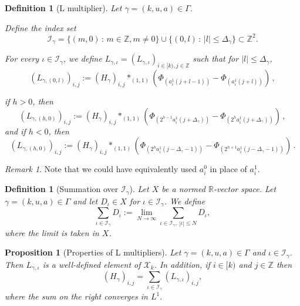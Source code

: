 \documentclass[12pt,reqno]{amsart}
\theoremstyle{plain}
\newtheorem{proposition}[theorem]{Proposition}
\newtheorem{definition}[theorem]{Definition}
\numberwithin{equation}{section}
\theoremstyle{remark}
\newtheorem{rem}{Remark}[section]
\newcommand{\using}[1]{}
\newcommand{\Z}{{\mathbb Z}}
\newcommand{\R}{{\mathbb R}}
\begin{document}
\begin{definition}[L multiplier]\label{L multiplier}
Let $\gamma=(k,u,a)\in \Gamma$.

Define the index set
\begin{equation}\label{auto:L-kernel-index-set}\mathcal{I}_{\gamma} = \{(m,0)\,:\,m\in\mathbb{Z}, m\not=0\} \cup \{(0,l)\,:\,|l|\le \Delta_{\gamma}\} \subset \mathbb{Z}^2.\end{equation}

For every $\iota \in\mathcal{I}_{\gamma}$, we define  $L_{\gamma,\iota}=(L_{\gamma,\iota})_{i\in [k),j\in \Z}$
such that for $|l|\le \Delta_{\gamma}$,
\begin{equation}\label{auto:L-kernel-central-band}
  (L_{\gamma,(0,l)})_{i,j}:= (H_{\gamma})_{i,j} \ast_{(1,1)} (\Phi_{(a_i^1(j+l-1))}-\Phi_{(a_i^1(j+l))})\, ,
 \end{equation}

if $h>0$, then
\begin{equation}\label{auto:L-kernel-positive-band}
(L_{\gamma,(h,0)})_{i,j}:= (H_{\gamma})_{i,j} \ast_{(1,1)} (\Phi_{(2^{h-1}a_i^1(j+\Delta_{\gamma}))}-\Phi_{(2^{h}a_i^1(j+\Delta_{\gamma}))})\, ,
\end{equation}
and if $h<0$, then
\begin{equation}\label{auto:L-kernel-negative-band}
 (L_{\gamma,(h,0)})_{i,j}:= (H_{\gamma})_{i,j} \ast_{(1,1)} (\Phi_{(2^{h}a_i^1(j-\Delta_{\gamma}-1))}-\Phi_{(2^{h+1}a_i^1(j-\Delta_{\gamma}-1))})\, .
\end{equation}
\end{definition}

\begin{rem}
Note that we could have equivalently used $a_{i}^0$ in place of $a_i^1$.
\end{rem}


\begin{definition}[Summation over $\mathcal I_{\gamma}$]\label{summation-definition}
Let $X$ be a normed $\R$-vector space.
Let $\gamma=(k,u,a)\in \Gamma$ and let $D_\iota \in X$ for $\iota \in \mathcal{I}_{\gamma}$. We define
\begin{equation}\label{auto:symmetric-series-definition}
\sum_{\iota \in \mathcal{I}_{\gamma}} D_{\iota}:=\lim_{N\to \infty} \sum_{\iota \in\mathcal{I}_{\gamma}, ~|\iota| \leq N} D_{\iota},
\end{equation}
where the limit is taken in $X$.
\end{definition}

\begin{proposition}[Properties of L multipliers]\label{sum L multiplier convergence-L1}\using{P:schwartz-into-wiener}\using{convolution vector}\using{H-in-X}\using{L:F_t}\using{L:ft-infty}
Let $\gamma=(k,u,a)\in \Gamma$ and $\iota \in\mathcal{I}_{\gamma}$. Then
 $L_{\gamma,\iota}$ is a well-defined element of $\mathcal{X}_k$. In addition, if $i
\in [k)$ and $j\in \Z$ then
\begin{equation}\label{E:L2-convergence}
(H_{\gamma})_{i,j} = \sum_{\iota \in\mathcal{I}_{\gamma}} (L_{\gamma,\iota})_{i,j},
\end{equation}
where the sum on the right converges in $L^1$.
\end{proposition}
\end{document}

